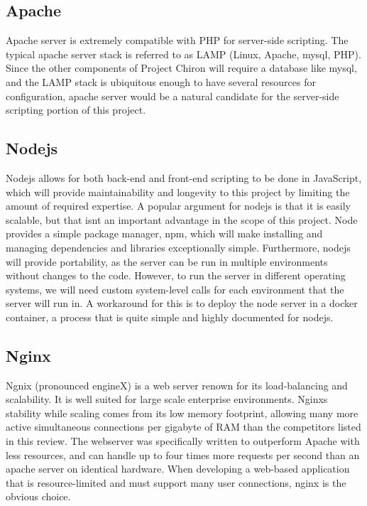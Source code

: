 \documentclass[onecolumn, draftclsnofoot,10pt, compsoc]{report}
\begin{document}
\subsection{Apache}
Apache server is extremely compatible with PHP for server-side scripting. The typical apache server stack is referred to
as LAMP (Linux, Apache, mysql, PHP). Since the other components of Project Chiron will require a database like mysql,
and the LAMP stack is ubiquitous enough to have several resources for configuration, apache server would be a natural
candidate for the server-side scripting portion of this project.
\subsection{Nodejs}
Nodejs allows for both back-end and front-end scripting to be done in JavaScript, which will provide maintainability
and longevity to this project by limiting the amount of required expertise. A popular argument for nodejs is that it
is easily scalable, but that isnt an important advantage in the scope of this project. Node provides a simple package
manager, npm, which will make installing and managing dependencies and libraries exceptionally simple. Furthermore,
nodejs will provide portability, as the server can be run in multiple environments without changes to the code. However,
to run the server in different operating systems, we will need custom system-level calls for each environment that the
server will run in. A workaround for this is to deploy the node server in a docker container, a process that is quite
simple and highly documented for nodejs.
\subsection{Nginx}
Ngnix (pronounced engineX) is a web server renown for its load-balancing and scalability. It is well suited for large
scale enterprise environments. Nginxs stability while scaling comes from its low memory footprint, allowing many
more active simultaneous connections per gigabyte of RAM than the competitors listed in this review. The webserver
was specifically written to outperform Apache with less resources, and can handle up to four times more requests per
second than an apache server on identical hardware. When developing a web-based application that is resource-limited
and must support many user connections, nginx is the obvious choice.
\end{document}
